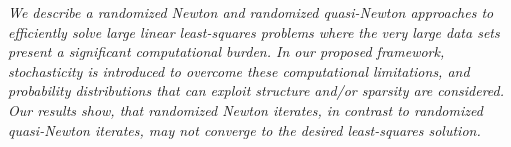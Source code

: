   \begin{multicols}{2}
      \textit{We describe a randomized Newton and randomized quasi-Newton approaches to efficiently solve large linear least-squares problems where the very large data sets present a significant computational burden. In our proposed framework, stochasticity is introduced to overcome these computational limitations, and probability distributions that can exploit structure and/or sparsity are considered. Our results show, that randomized Newton iterates, in contrast to randomized quasi-Newton iterates, may not converge to the desired least-squares solution.}\\
\\ 
        \\
        \\\\
        \\
        \\\\
        \\
        \\\\
        \\
        \\\\
        \\
        \\\\
\\
      \textit{}\\
\\ 
        \\
        \\\\
        \\
        \\\\
        \\
        \\\\
        \\
        \\\\
        \\

\end{multicols}
